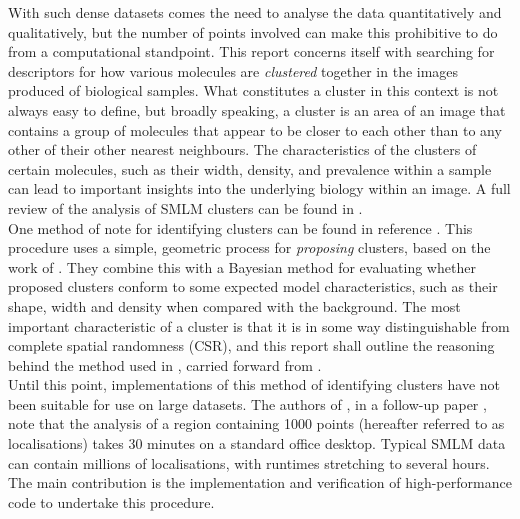 \documentclass[11pt]{article}
\begin{document}
With such dense datasets comes the need to analyse the data quantitatively and qualitatively, but the number of points involved can make this prohibitive to do from a computational standpoint. This report concerns itself with searching for descriptors for how various molecules are \textit{clustered} together in the images produced of biological samples. What constitutes a cluster in this context is not always easy to define, but broadly speaking, a cluster is an area of an image that contains a group of molecules that appear to be closer to each other than to any other of their other nearest neighbours. The characteristics of the clusters of certain molecules, such as their width, density, and prevalence within a sample can lead to important insights into the underlying biology within an image. A full review of the analysis of SMLM clusters can be found in \cite{Khater2020}.\\

One method of note for identifying clusters can be found in reference \cite{Rubin-Delanchy2015}. This procedure uses a simple, geometric process for \textit{proposing} clusters, based on the work of \cite{getisAndFranklin}. They combine this with a Bayesian method for evaluating whether proposed clusters conform to some expected model characteristics, such as their shape, width and density when compared with the background. The most important characteristic of a cluster is that it is in some way distinguishable from complete spatial randomness (CSR), and this report shall outline the reasoning behind the method used in \cite{Rubin-Delanchy2015}, carried forward from \cite{getisAndFranklin}. \\

Until this point, implementations of this method of identifying clusters have not been suitable for use on large datasets. The authors of \cite{Rubin-Delanchy2015}, in a follow-up paper \cite{griffie2016bayesian}, note that the analysis of a region containing 1000 points (hereafter referred to as localisations) takes 30 minutes on a standard office desktop. Typical SMLM data can contain millions of localisations, with runtimes stretching to several hours. The main contribution is the implementation and verification of high-performance code to undertake this procedure. 





\newpage
\end{document}
